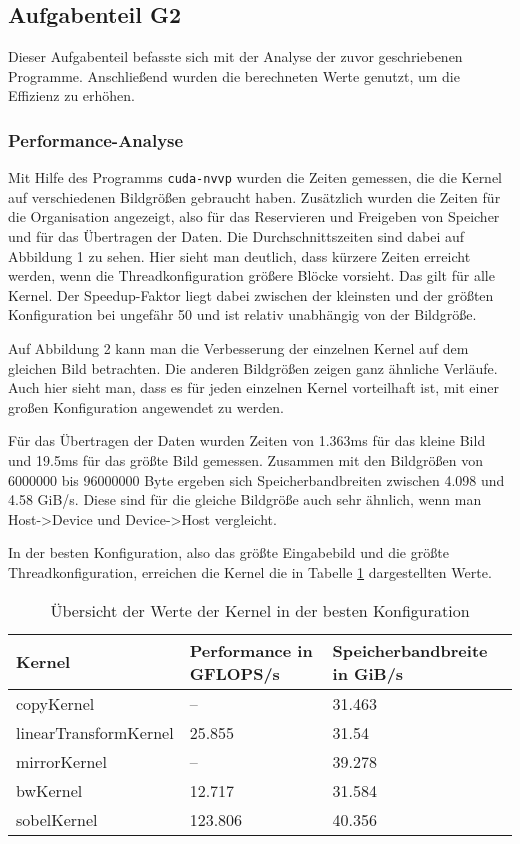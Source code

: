 \documentclass[12pt,a4paper]{scrartcl}
\begin{document}
\subsection{Aufgabenteil G2}
Dieser Aufgabenteil befasste sich mit der Analyse der zuvor geschriebenen Programme.
Anschlie\ss end wurden die berechneten Werte genutzt, um die Effizienz zu erh\"ohen.

\subsubsection{Performance-Analyse}
Mit Hilfe des Programms \texttt{cuda-nvvp} wurden die Zeiten gemessen, die die Kernel auf verschiedenen Bildgr\"o\ss en gebraucht haben.
Zus\"atzlich wurden die Zeiten f\"ur die Organisation angezeigt, also f\"ur das Reservieren und Freigeben von Speicher und f\"ur das \"Ubertragen der Daten.
Die Durchschnittszeiten sind dabei auf Abbildung 1 zu sehen.
Hier sieht man deutlich, dass k\"urzere Zeiten erreicht werden, wenn die Threadkonfiguration gr\"o\ss ere Bl\"ocke vorsieht.
Das gilt f\"ur alle Kernel.
Der Speedup-Faktor liegt dabei zwischen der kleinsten und der gr\"o\ss ten Konfiguration bei ungef\"ahr 50 und ist relativ unabh\"angig von der Bildgr\"o\ss e.

Auf Abbildung 2 kann man die Verbesserung der einzelnen Kernel auf dem gleichen Bild betrachten.
Die anderen Bildgr\"o\ss en zeigen ganz \"ahnliche Verl\"aufe.
Auch hier sieht man, dass es f\"ur jeden einzelnen Kernel vorteilhaft ist, mit einer gro\ss en Konfiguration angewendet zu werden.

F\"ur das \"Ubertragen der Daten wurden Zeiten von 1.363ms f\"ur das kleine Bild und 19.5ms f\"ur das gr\"o\ss te Bild gemessen.
Zusammen mit den Bildgr\"o\ss en von 6000000 bis 96000000 Byte ergeben sich Speicherbandbreiten zwischen 4.098 und 4.58 GiB/s.
Diese sind f\"ur die gleiche Bildgr\"o\ss e auch sehr \"ahnlich, wenn man Host->Device und Device->Host vergleicht.

In der besten Konfiguration, also das gr\"o\ss te Eingabebild und die gr\"o\ss te Threadkonfiguration, erreichen die Kernel die in Tabelle \ref{perf} dargestellten Werte.

\begin{table}[h]
    \centering
    \begin{tabular}{l|l|l}
    \hline
    Kernel & Performance in GFLOPS/s & Speicherbandbreite in GiB/s \\
    \hline
    copyKernel & --                  & 31.463 \\
    linearTransformKernel & 25.855   & 31.54 \\
    mirrorKernel & --                & 39.278 \\
    bwKernel & 12.717                & 31.584 \\
    sobelKernel & 123.806            & 40.356 \\
    \hline
    \end{tabular}
    \caption{\"Ubersicht der Werte der Kernel in der besten Konfiguration}
    \label{perf}
\end{table}
\end{document}
